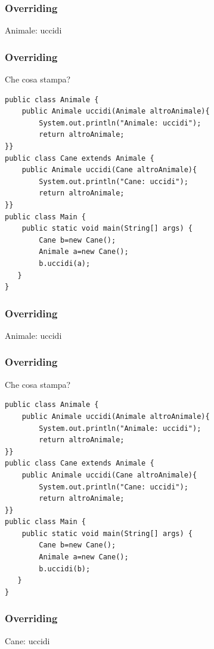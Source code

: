 \documentclass{beamer}
\begin{document}
\begin{frame}[fragile]
\frametitle{Overriding}
\begin{framed}
Animale: uccidi
\end{framed}
\end{frame}

\begin{frame}[fragile]
\frametitle{Overriding}
\begin{framed}
Che cosa stampa?
\begin{lstlisting}
public class Animale {
	public Animale uccidi(Animale altroAnimale){
	    System.out.println("Animale: uccidi");
	    return altroAnimale;
}}
public class Cane extends Animale {
	public Animale uccidi(Cane altroAnimale){
	    System.out.println("Cane: uccidi");
	    return altroAnimale;
}}
public class Main {
    public static void main(String[] args) {
        Cane b=new Cane();
        Animale a=new Cane();
        b.uccidi(a);
   }
}
\end{lstlisting}
\end{framed}
\end{frame}

\begin{frame}[fragile]
\frametitle{Overriding}
\begin{framed}
Animale: uccidi
\end{framed}
\end{frame}


\begin{frame}[fragile]
\frametitle{Overriding}
\begin{framed}
Che cosa stampa?
\begin{lstlisting}
public class Animale {
    public Animale uccidi(Animale altroAnimale){
        System.out.println("Animale: uccidi");
        return altroAnimale;
}}
public class Cane extends Animale {
    public Animale uccidi(Cane altroAnimale){
        System.out.println("Cane: uccidi");
        return altroAnimale;
}}
public class Main {
    public static void main(String[] args) {
        Cane b=new Cane();
        Animale a=new Cane();
        b.uccidi(b);
   }
}
\end{lstlisting}
\end{framed}
\end{frame}

\begin{frame}[fragile]
\frametitle{Overriding}
\begin{framed}
Cane: uccidi
\end{framed}
\end{frame}
\end{document}
